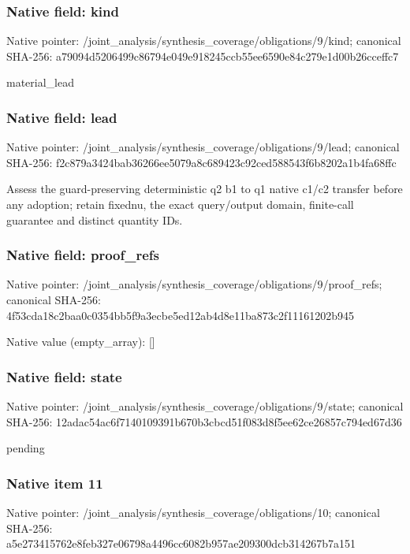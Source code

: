 \documentclass[10pt,a4paper]{article}
\begin{document}
\subsubsection{Native field: kind}
Native pointer: /joint\_\allowbreak{}analysis/synthesis\_\allowbreak{}coverage/obligations/9/kind; canonical SHA-256: a79094d5206499c86794e049e918245ccb55ee6590e84c279e1d00b26cceffc7

\begingroup\raggedright\sloppy material\_\allowbreak{}lead\par\endgroup

\subsubsection{Native field: lead}
Native pointer: /joint\_\allowbreak{}analysis/synthesis\_\allowbreak{}coverage/obligations/9/lead; canonical SHA-256: f2c879a3424bab36266ee5079a8c689423c92ced588543f6b8202a1b4fa68ffc

\begingroup\raggedright\sloppy Assess the guard-preserving deterministic q2 b1 to q1 native c1/\allowbreak{}c2 transfer before any adoption;\allowbreak{} retain fixednu,\allowbreak{} the exact query/\allowbreak{}output domain,\allowbreak{} finite-call guarantee and distinct quantity IDs.\par\endgroup

\subsubsection{Native field: proof\_\allowbreak{}refs}
Native pointer: /joint\_\allowbreak{}analysis/synthesis\_\allowbreak{}coverage/obligations/9/proof\_\allowbreak{}refs; canonical SHA-256: 4f53cda18c2baa0c0354bb5f9a3ecbe5ed12ab4d8e11ba873c2f11161202b945

Native value (empty\_\allowbreak{}array): []

\subsubsection{Native field: state}
Native pointer: /joint\_\allowbreak{}analysis/synthesis\_\allowbreak{}coverage/obligations/9/state; canonical SHA-256: 12adac54ac6f7140109391b670b3cbcd51f083d8f5ee62ce26857c794ed67d36

\begingroup\raggedright\sloppy pending\par\endgroup

\subsubsection{Native item 11}
Native pointer: /joint\_\allowbreak{}analysis/synthesis\_\allowbreak{}coverage/obligations/10; canonical SHA-256: a5e273415762e8feb327e06798a4496cc6082b957ae209300dcb314267b7a151
\end{document}
